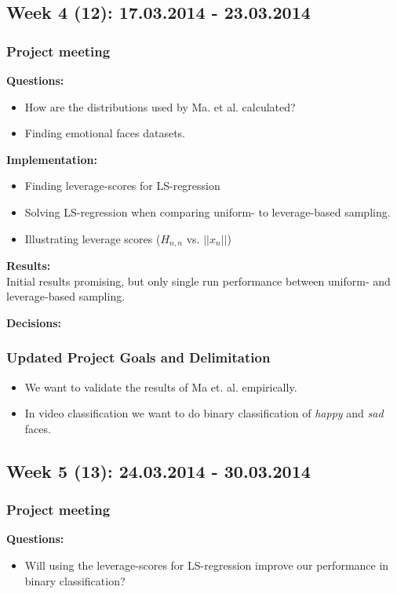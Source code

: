 \subsection*{Week 4 (12): 17.03.2014 - 23.03.2014}
\subsubsection*{Project meeting}
\textbf{Questions:}\\
\begin{itemize}
\item How are the distributions used by Ma. et al. calculated?
\item Finding emotional faces datasets.
\end{itemize}

\textbf{Implementation:}\\
\begin{itemize}
\item Finding leverage-scores for LS-regression
\item Solving LS-regression when comparing uniform- to leverage-based sampling.
\item Illustrating leverage scores ($H_{n,n}$ vs. $||x_n||$)
\end{itemize}

\textbf{Results:}\\
Initial results promising, but only single run performance between uniform- and leverage-based sampling.

\textbf{Decisions:}\\

\subsubsection*{Updated Project Goals and Delimitation}
\begin{itemize}
\item We want to validate the results of Ma et. al. empirically.
\item In video classification we want to do binary classification of \emph{happy} and \emph{sad} faces.
\end{itemize}


\subsection*{Week 5 (13): 24.03.2014 - 30.03.2014}
\subsubsection*{Project meeting}
\textbf{Questions:}\\
\begin{itemize}
\item Will using the leverage-scores for LS-regression improve our performance in binary classification?
\end{itemize}

